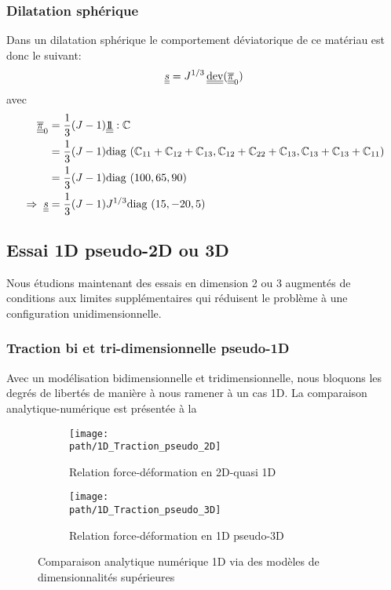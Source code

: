\documentclass[10pt]{book}
\def\path{./fig}
\begin{document}
\subsubsection{Dilatation sphérique}
Dans un dilatation sphérique le comportement déviatorique de ce matériau est donc le suivant:
$$\devia =\J^{1/3}\dev(\SPKo)$$
avec 
$$\begin{aligned}
\overline{\underline{\underline{\pi}}}_{0} &= \dfrac{1}{3}(J-1)\underline{\underline{1\!\!1}}:\mathbb{C}\\
& = \dfrac{1}{3}(J-1)\mathrm{diag}\,\left(\mathbb{C}_{11}+\mathbb{C}_{12}+\mathbb{C}_{13},\mathbb{C}_{12}+\mathbb{C}_{22}+\mathbb{C}_{13},\mathbb{C}_{13}+\mathbb{C}_{13}+\mathbb{C}_{11}
\right)\\
&= \dfrac{1}{3}(J-1)\mathrm{diag}\,\left(100, 65, 90\right)\\
\; \Rightarrow \; \underline{\underline{s}}&=\dfrac{1}{3}(J-1)J^{1/3}\mathrm{diag}\,\left(15, -20, 5\right)
\end{aligned}$$
\subsection{Essai 1D pseudo-2D ou 3D}
Nous étudions maintenant des essais en dimension 2 ou 3 augmentés de conditions aux limites supplémentaires qui réduisent le problème à une configuration unidimensionnelle.
\subsubsection{Traction bi et tri-dimensionnelle pseudo-1D}
Avec un modélisation bidimensionnelle et tridimensionnelle, nous bloquons les degrés de libertés de manière à nous ramener à un cas 1D. La comparaison analytique-numérique est présentée à la 
\begin{figure}[h!]
\begin{subfigure}[b]{0.49\textwidth}
\centering \texttt{[image: \\path/1D\_Traction\_pseudo\_2D]}
\caption{Relation force-déformation en 2D-quasi 1D}
\label{fig:1D_Traction_pseudo_2D}
\end{subfigure}\hfill
\begin{subfigure}[b]{0.49\textwidth}
\centering \texttt{[image: \\path/1D\_Traction\_pseudo\_3D]}
\caption{Relation force-déformation en 1D pseudo-3D}
\label{fig:1D_Traction_pseudo_2D}
\end{subfigure}
\caption{Comparaison analytique numérique 1D via des modèles de dimensionnalités supérieures}
\label{fig:1D_Traction_pseudo_2_3D}
\end{figure}
\end{document}
